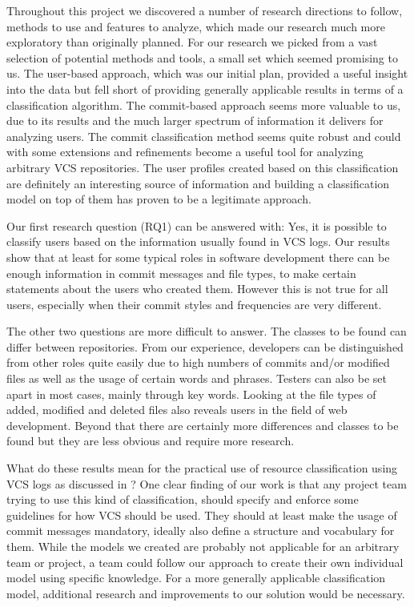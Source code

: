 Throughout this project we discovered a number of research directions to follow, methods to use and features to analyze, which made our research much more exploratory than originally planned. For our research we picked from a vast selection of potential methods and tools, a small set which seemed promising to us. %
The user-based approach, which was our initial plan, provided a useful insight into the data but fell short of providing generally applicable results in terms of a classification algorithm. The commit-based approach seems more valuable to us, due to its results and the much larger spectrum of information it delivers for analyzing users. The commit classification method seems quite robust and could with some extensions and refinements become a useful tool for analyzing arbitrary VCS repositories. The user profiles created based on this classification are definitely an interesting source of information and building a classification model on top of them has proven to be a legitimate approach. 

Our first research question (RQ1) can be answered with: Yes, it is possible to classify users based on the information usually found in VCS logs. Our results show that at least for some typical roles in software development there can be enough information in commit messages and file types, to make certain statements about the users who created them. However this is not true for all users, especially when their commit styles and frequencies are very different.

The other two questions are more difficult to answer. The classes to be found can differ between repositories. From our experience, developers can be distinguished from other roles quite easily due to high numbers of commits and/or modified files as well as the usage of certain words and phrases. Testers can also be set apart in most cases, mainly through key words. Looking at the file types of added, modified and deleted files also reveals users in the field of web development. Beyond that there are certainly more differences and classes to be found but they are less obvious and require more research.

What do these results mean for the practical use of resource classification using VCS logs as discussed in ? One clear finding of our work is that any project team trying to use this kind of classification, should specify and enforce some guidelines for how VCS should be used. They should at least make the usage of commit messages mandatory, ideally also define a structure and vocabulary for them. While the models we created are probably not applicable for an arbitrary team or project, a team could follow our approach to create their own individual model using specific knowledge. For a more generally applicable classification model, additional research and improvements to our solution would be necessary. 

